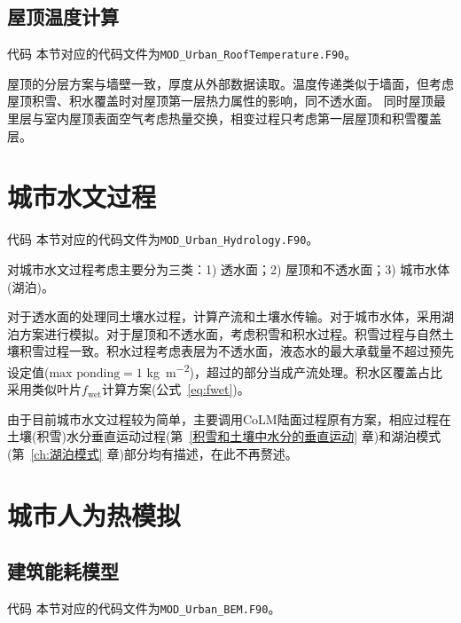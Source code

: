 \subsection{屋顶温度计算}

\begin{mymdframed}{代码}
  本节对应的代码文件为\texttt{MOD\_Urban\_RoofTemperature.F90}。
\end{mymdframed}

屋顶的分层方案与墙壁一致，厚度从外部数据读取。温度传递类似于墙面，但考虑屋顶积雪、积水覆盖时对屋顶第一层热力属性的影响，同不透水面。
同时屋顶最里层与室内屋顶表面空气考虑热量交换，相变过程只考虑第一层屋顶和积雪覆盖层。


\section{城市水文过程}

\begin{mymdframed}{代码}
  本节对应的代码文件为\texttt{MOD\_Urban\_Hydrology.F90}。
\end{mymdframed}

对城市水文过程考虑主要分为三类：1) 透水面；2) 屋顶和不透水面；3) 城市水体(湖泊)。

对于透水面的处理同土壤水过程，计算产流和土壤水传输。对于城市水体，采用湖泊方案进行模拟。对于屋顶和不透水面，考虑积雪和积水过程。积雪过程与自然土壤积雪过程一致。积水过程考虑表层为不透水面，液态水的最大承载量不超过预先设定值($\text{max ponding}=1$ \unit{kg.m^{-2}})，超过的部分当成产流处理。积水区覆盖占比采用类似叶片$f_{\mathrm{wet}}$计算方案(公式~\eqref{eq:fwet})。

由于目前城市水文过程较为简单，主要调用CoLM陆面过程原有方案，相应过程在土壤(积雪)水分垂直运动过程(第~\ref{积雪和土壤中水分的垂直运动} 章)和湖泊模式(第~\ref{ch:湖泊模式} 章)部分均有描述，在此不再赘述。


\section{城市人为热模拟}

\subsection{建筑能耗模型}\label{建筑能耗模型}

\begin{mymdframed}{代码}
  本节对应的代码文件为\texttt{MOD\_Urban\_BEM.F90}。
\end{mymdframed}

